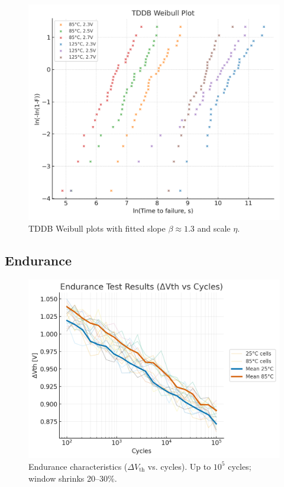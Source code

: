 \documentclass[conference]{IEEEtran}
\newcommand{\figw}{0.90\linewidth}
\begin{document}
\begin{figure}[!t]
  \centering
  \includegraphics[width=\figw]{figures/fig4_tddb_weibull.png}
  \caption{TDDB Weibull plots with fitted slope $\beta \approx 1.3$ and scale $\eta$.}
  \label{fig:tddb_weibull}
\end{figure}

\subsection{Endurance}
\begin{figure}[!t]
  \centering
  \includegraphics[width=\figw]{figures/fig5_endurance.png}
  \caption{Endurance characteristics ($\Delta V_{\mathrm{th}}$ vs. cycles). Up to $10^5$ cycles; window shrinks 20--30\%.}
  \label{fig:endurance}
\end{figure}
\end{document}
